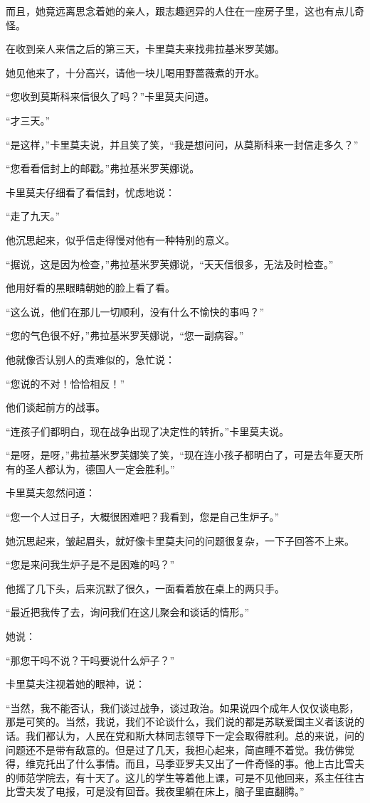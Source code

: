 而且，她竟远离思念着她的亲人，跟志趣迥异的人住在一座房子里，这也有点儿奇怪。

在收到亲人来信之后的第三天，卡里莫夫来找弗拉基米罗芙娜。

她见他来了，十分高兴，请他一块儿喝用野蔷薇煮的开水。

“您收到莫斯科来信很久了吗？”卡里莫夫问道。

“才三天。”

“是这样，”卡里莫夫说，并且笑了笑，“我是想问问，从莫斯科来一封信走多久？”

“您看看信封上的邮戳。”弗拉基米罗芙娜说。

卡里莫夫仔细看了看信封，忧虑地说：

“走了九天。”

他沉思起来，似乎信走得慢对他有一种特别的意义。

“据说，这是因为检查，”弗拉基米罗芙娜说，“天天信很多，无法及时检查。”

他用好看的黑眼睛朝她的脸上看了看。

“这么说，他们在那儿一切顺利，没有什么不愉快的事吗？”

“您的气色很不好，”弗拉基米罗芙娜说，“您一副病容。”

他就像否认别人的责难似的，急忙说：

“您说的不对！恰恰相反！”

他们谈起前方的战事。

“连孩子们都明白，现在战争出现了决定性的转折。”卡里莫夫说。

“是呀，是呀，”弗拉基米罗芙娜笑了笑，“现在连小孩子都明白了，可是去年夏天所有的圣人都认为，德国人一定会胜利。”

卡里莫夫忽然问道：

“您一个人过日子，大概很困难吧？我看到，您是自己生炉子。”

她沉思起来，皱起眉头，就好像卡里莫夫问的问题很复杂，一下子回答不上来。

“您是来问我生炉子是不是困难的吗？”

他摇了几下头，后来沉默了很久，一面看着放在桌上的两只手。

“最近把我传了去，询问我们在这儿聚会和谈话的情形。”

她说：

“那您干吗不说？干吗要说什么炉子？”

卡里莫夫注视着她的眼神，说：

“当然，我不能否认，我们谈过战争，谈过政治。如果说四个成年人仅仅谈电影，那是可笑的。当然，我说，我们不论谈什么，我们说的都是苏联爱国主义者该说的话。我们都认为，人民在党和斯大林同志领导下一定会取得胜利。总的来说，问的问题还不是带有敌意的。但是过了几天，我担心起来，简直睡不着觉。我仿佛觉得，维克托出了什么事情。而且，马季亚罗夫又出了一件奇怪的事。他上古比雪夫的师范学院去，有十天了。这儿的学生等着他上课，可是不见他回来，系主任往古比雪夫发了电报，可是没有回音。我夜里躺在床上，脑子里直翻腾。”

